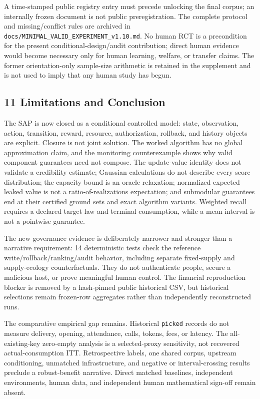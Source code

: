 \documentclass[
  11pt]{article}
\begin{document}
A time-stamped public registry entry must precede unlocking the final
corpus; an internally frozen document is not public preregistration. The
complete protocol and missing/conflict rules are archived in
\texttt{docs/MINIMAL\_VALID\_EXPERIMENT\_v1.10.md}. No human RCT is a
precondition for the present conditional-design/audit contribution;
direct human evidence would become necessary only for human learning,
welfare, or transfer claims. The former orientation-only sample-size
arithmetic is retained in the supplement and is not used to imply that
any human study has begun.

\subsection{11 Limitations and
Conclusion}\label{limitations-and-conclusion}

The SAP is now closed as a conditional controlled model: state,
observation, action, transition, reward, resource, authorization,
rollback, and history objects are explicit. Closure is not joint
solution. The worked algorithm has no global approximation claim, and
the monitoring counterexample shows why valid component guarantees need
not compose. The update-value identity does not validate a credibility
estimate; Gaussian calculations do not describe every score
distribution; the capacity bound is an oracle relaxation; normalized
expected leaked value is not a ratio-of-realizations expectation; and
submodular guarantees end at their certified ground sets and exact
algorithm variants. Weighted recall requires a declared target law and
terminal consumption, while a mean interval is not a pointwise
guarantee.

The new governance evidence is deliberately narrower and stronger than a
narrative requirement: 14 deterministic tests check the reference
write/rollback/ranking/audit behavior, including separate fixed-supply
and supply-ecology counterfactuals. They do not authenticate people,
secure a malicious host, or prove meaningful human control. The
financial reproduction blocker is removed by a hash-pinned public
historical CSV, but historical selections remain frozen-row aggregates
rather than independently reconstructed runs.

The comparative empirical gap remains. Historical \texttt{picked}
records do not measure delivery, opening, attendance, calls, tokens,
fees, or latency. The all-existing-key zero-empty analysis is a
selected-proxy sensitivity, not recovered actual-consumption ITT.
Retrospective labels, one shared corpus, upstream conditioning,
unmatched infrastructure, and negative or interval-crossing results
preclude a robust-benefit narrative. Direct matched baselines,
independent environments, human data, and independent human mathematical
sign-off remain absent.
\end{document}
